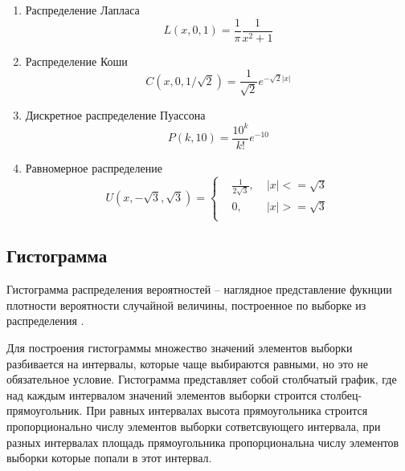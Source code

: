 \documentclass[12pt]{article}
\begin{document}
\begin{flushleft}
\begin{enumerate}
            \item Распределение Лапласа
            \begin{equation}
                L(x, 0, 1) = \frac{1}{\pi}\frac{1}{x^2 + 1}
                \label{laplace}
            \end{equation}

            \item Распределение Коши
            \begin{equation}
                C(x, 0, 1/\sqrt{2}) =\frac{1}{\sqrt{2}} e^{-\sqrt{2}|x|}
                \label{cauchy}
            \end{equation}

            \item Дискретное распределение Пуассона
            \begin{equation}
                P(k, 10) = \frac{10^k}{k!} e^{-10}
                \label{poisson}
            \end{equation}

            \item Равномерное распределение
            \begin{equation}
                U(x, -\sqrt{3}, \sqrt{3}) = 
                \left\{
                \begin{aligned}
                    & \frac{1}{2\sqrt{3}},& \; |x| <= \sqrt{3}\\
                    & 0,                  & \; |x| >= \sqrt{3}\\
                \end{aligned}
                \right.
                \label{uniform}
            \end{equation}
        \end{enumerate}

    \subsection{Гистограмма}

        Гистограмма распределения вероятностей -- наглядное представление фукнции плотности вероятности случайной величины, построенное по выборке из распределения \cite{histogram}.

        Для построения гистограммы множество значений элементов выборки разбивается на интервалы, которые чаще выбираются равными, но это не обязательное условие. Гистограмма представляет собой столбчатый график, где над каждым интервалом значений элементов выборки строится столбец-прямоугольник.  При равных интервалах высота прямоугольника строится пропорционально числу элементов выборки сответсвующего интервала, при разных интервалах площадь прямоугольника пропорциональна числу элементов выборки которые попали в этот интервал.


\end{flushleft}
\end{document}
